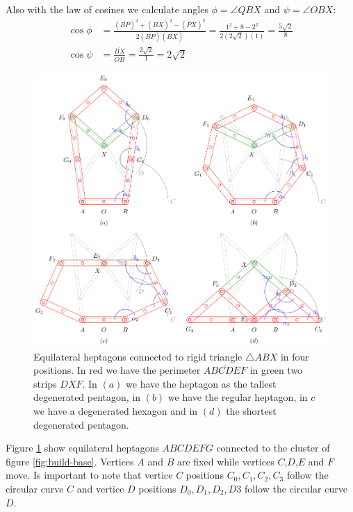 \documentclass[11pt]{article}
\begin{document}
Also with the law of cosines we calculate angles $\phi = \angle{QBX}$ and $\psi = \angle{OBX}$:
\begin{align}
\cos\phi &= \frac{(\overline{BP})^2 + (\overline{BX})^2 - (\overline{PX})^2}
 {2(\overline{BP})(\overline{BX})} 
 = \frac{1^2 + 8 - 2^2}{2(2\sqrt2)(1)} = \frac{5\sqrt2}8 \label{eq:phi} \\
\cos\psi &= \frac{\overline{BX}}{\overline{OB}} = \frac{2\sqrt2}{1} = 2\sqrt2 \label{eq:psi}
\end{align}

\begin{figure}[h]
\centering
\includegraphics[scale=0.9]{builder/hepta-0}
\caption{Equilateral heptagons connected to rigid triangle $\triangle{ABX}$ in four positions. In red we have the perimeter $\overline{ABCDEF}$ in green two strips $\overline{DXF}$. In $(a)$ we have the heptagon as the tallest degenerated pentagon, in $(b)$ we have the regular heptagon, in $c$ we have a degenerated hexagon and in $(d)$ the shortest degenerated pentagon.}
\label{fig:build}
\end{figure}

Figure \ref{fig:build} show equilateral heptagons $ABCDEFG$ connected to the cluster of figure \ref{fig:build-base}. Vertices $A$ and $B$ are fixed while vertices $C$,$D$,$E$ and $F$ move. Is important to note that vertice $C$ positions $C_0,C_1,C_2,C_3$ follow the circular curve $C$ and vertice $D$ positions $D_0,D_1,D_2,D3$ follow the circular curve $D$.
\end{document}
